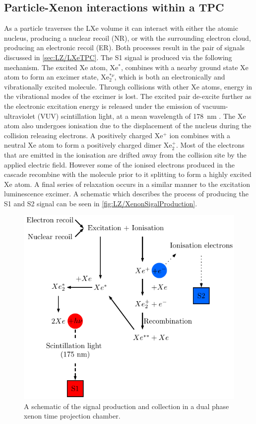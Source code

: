 \subsection{Particle-Xenon interactions within a TPC}\label{sec:LZ/XeInteractionsTPC}
As a particle traverses the LXe volume it can interact with either the atomic nucleus, producing a nuclear recoil (NR), or with the surrounding electron cloud, producing an electronic recoil (ER). Both processes result in the pair of signals discussed in \autoref{sec:LZ/LXeTPC}. The S1 signal is produced via the following mechanism. The excited Xe atom, Xe$^{*}$, combines with a nearby ground state Xe atom to form an excimer state, Xe$_{2}^{*\nu}$, which is both an electronically and vibrationally excited molecule. Through collisions with other Xe atoms, energy in the vibrational modes of the excimer is lost. The excited pair de-excite further as the electronic excitation energy is released under the emission of vacuum-ultraviolet (VUV) scintillation light, at a mean wavelength of 178~nm \cite{Schumann:2014uva}.
The Xe atom also undergoes ionisation due to the displacement of the nucleus during the collision releasing electrons. A positively charged Xe$^{+}$ ion combines with a neutral Xe atom to form a positively charged dimer Xe$^{+}_{2}$. Most of the electrons that are emitted in the ionisation are drifted away from the collision site by the applied electric field. However some of the ionised electrons produced in the cascade recombine with the molecule prior to it splitting to form a highly excited Xe atom. A final series of relaxation occurs in a similar manner to the excitation luminescence excimer. A schematic which describes the process of producing the S1 and S2 signal can be seen in \autoref{fig:LZ/XenonSigalProduction}.
\begin{figure}[!ht]
    \centering
    \includegraphics[width=0.7\linewidth]{figures/LZ/Xenon_interaction.pdf}
    \caption{A schematic of the signal production and collection in a dual phase xenon time projection chamber.}
    \label{fig:LZ/XenonSigalProduction}
\end{figure}
